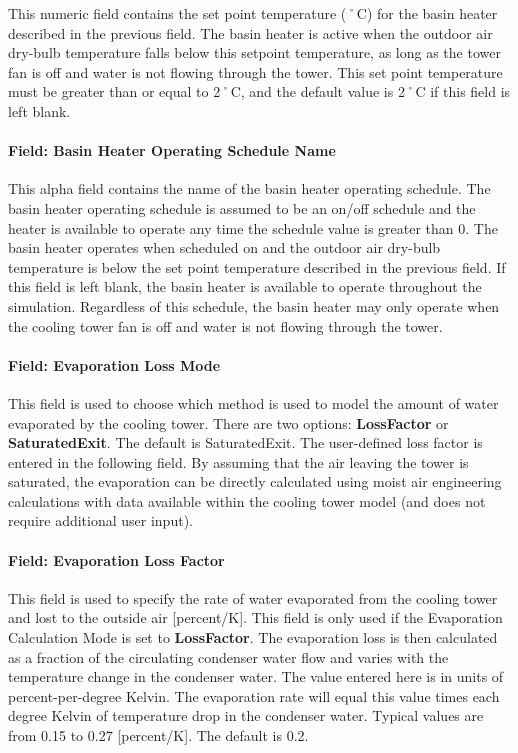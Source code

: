 This numeric field contains the set point temperature (˚C) for the basin heater described in the previous field. The basin heater is active when the outdoor air dry-bulb temperature falls below this setpoint temperature, as long as the tower fan is off and water is not flowing through the tower. This set point temperature must be greater than or equal to 2˚C, and the default value is 2˚C if this field is left blank.

\paragraph{Field: Basin Heater Operating Schedule Name}\label{field-basin-heater-operating-schedule-name-2}

This alpha field contains the name of the basin heater operating schedule. The basin heater operating schedule is assumed to be an on/off schedule and the heater is available to operate any time the schedule value is greater than 0. The basin heater operates when scheduled on and the outdoor air dry-bulb temperature is below the set point temperature described in the previous field. If this field is left blank, the basin heater is available to operate throughout the simulation. Regardless of this schedule, the basin heater may only operate when the cooling tower fan is off and water is not flowing through the tower.

\paragraph{Field: Evaporation Loss Mode}\label{field-evaporation-loss-mode-2}

This field is used to choose which method is used to model the amount of water evaporated by the cooling tower. There are two options: \textbf{LossFactor} or \textbf{SaturatedExit}. The default is SaturatedExit. The user-defined loss factor is entered in the following field. By assuming that the air leaving the tower is saturated, the evaporation can be directly calculated using moist air engineering calculations with data available within the cooling tower model (and does not require additional user input).

\paragraph{Field: Evaporation Loss Factor}\label{field-evaporation-loss-factor-2}

This field is used to specify the rate of water evaporated from the cooling tower and lost to the outside air {[}percent/K{]}. This field is only used if the Evaporation Calculation Mode is set to \textbf{LossFactor}. The evaporation loss is then calculated as a fraction of the circulating condenser water flow and varies with the temperature change in the condenser water. The value entered here is in units of percent-per-degree Kelvin. The evaporation rate will equal this value times each degree Kelvin of temperature drop in the condenser water. Typical values are from 0.15 to 0.27 {[}percent/K{]}. The default is 0.2.

